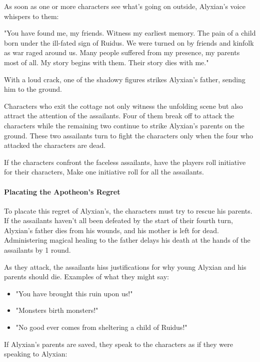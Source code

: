\documentclass[10pt,a4paper,twoside,bg=print,twocolumn,openany,nodeprecatedcode]{dndbook}
\begin{document}
As soon as one or more characters see what's going on outside, Alyxian's voice whispers to them:

\begin{DndReadAloud}{}
"You have found me, my friends. Witness my earliest memory. The pain of a child born under the ill-fated sign of Ruidus. We were turned on by friends and kinfolk as war raged around us. Many people suffered from my presence, my parents most of all. My story begins with them. Their story dies with me."

With a loud crack, one of the shadowy figures strikes Alyxian's father, sending him to the ground.

\end{DndReadAloud}

Characters who exit the cottage not only witness the unfolding scene but also attract the attention of the assailants. Four of them break off to attack the characters while the remaining two continue to strike Alyxian's parents on the ground. These two assailants turn to fight the characters only when the four who attacked the characters are dead.

If the characters confront the faceless assailants, have the players roll initiative for their characters, Make one initiative roll for all the assailants.

\paragraph{Placating the Apotheon's Regret}
To placate this regret of Alyxian's, the characters must try to rescue his parents. If the assailants haven't all been defeated by the start of their fourth turn, Alyxian's father dies from his wounds, and his mother is left for dead. Administering magical healing to the father delays his death at the hands of the assailants by 1 round.

As they attack, the assailants hiss justifications for why young Alyxian and his parents should die. Examples of what they might say:


\begin{itemize}
\item "You have brought this ruin upon us!"
\item "Monsters birth monsters!"
\item "No good ever comes from sheltering a child of Ruidus!"
\end{itemize}

If Alyxian's parents are saved, they speak to the characters as if they were speaking to Alyxian:
\end{document}

